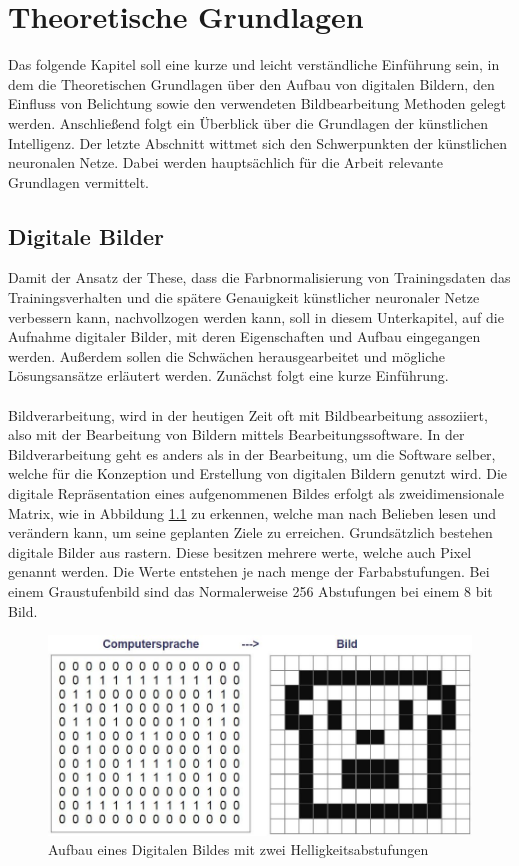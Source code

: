 \chapter{Theoretische Grundlagen}\label{s.grundlagen}
Das folgende Kapitel soll eine kurze und leicht verständliche Einführung sein, in dem die Theoretischen Grundlagen über den Aufbau von digitalen Bildern, den Einfluss von Belichtung sowie den verwendeten Bildbearbeitung Methoden gelegt werden. Anschließend folgt ein Überblick über die Grundlagen der künstlichen Intelligenz. Der letzte Abschnitt wittmet sich den Schwerpunkten der künstlichen neuronalen Netze. Dabei werden hauptsächlich für die Arbeit relevante Grundlagen vermittelt. 
\section{Digitale Bilder}\label{s.digibilder}
Damit der Ansatz der These, dass die Farbnormalisierung von Trainingsdaten das Trainingsverhalten und die spätere Genauigkeit künstlicher neuronaler Netze verbessern kann, nachvollzogen werden kann, soll in diesem Unterkapitel, auf die Aufnahme digitaler Bilder, mit deren Eigenschaften und Aufbau eingegangen werden. Außerdem sollen die Schwächen herausgearbeitet und mögliche Lösungsansätze erläutert werden. Zunächst folgt eine kurze Einführung.\\\\
Bildverarbeitung, wird in der heutigen Zeit oft mit Bildbearbeitung assoziiert, also mit der Bearbeitung von Bildern mittels Bearbeitungssoftware. In der Bildverarbeitung geht es anders als in der Bearbeitung, um die Software selber, welche für die Konzeption und Erstellung von digitalen Bildern genutzt wird. Die digitale Repräsentation eines aufgenommenen Bildes erfolgt als zweidimensionale Matrix, wie in Abbildung \ref{img:digitalesbild} zu erkennen, welche man nach Belieben lesen und verändern kann, um seine geplanten Ziele zu erreichen. Grundsätzlich bestehen digitale Bilder aus rastern. Diese besitzen mehrere werte, welche auch Pixel genannt werden. Die Werte entstehen je nach menge der Farbabstufungen. Bei einem Graustufenbild sind das Normalerweise 256 Abstufungen bei einem 8 bit Bild. 
\begin{figure}
[h]
\centering
\includegraphics[scale=0.5]{Sources/Digitalesbild.JPG}
\caption{Aufbau eines Digitalen Bildes mit zwei Helligkeitsabstufungen}
\label{img:digitalesbild}
\end{figure}\\
